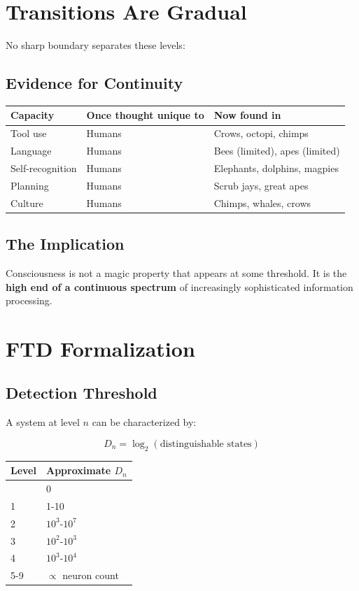 \documentclass[
  11pt,
  letterpaper,
  twoside,
  openright]{book}
\begin{document}
\section{Transitions Are Gradual}\label{transitions-are-gradual}

No sharp boundary separates these levels:

\subsection{Evidence for Continuity}\label{evidence-for-continuity}

\begin{longtable}[]{@{}lll@{}}
\toprule\noalign{}
Capacity & Once thought unique to & Now found in \\
\midrule\noalign{}
\endhead
\bottomrule\noalign{}
\endlastfoot
Tool use & Humans & Crows, octopi, chimps \\
Language & Humans & Bees (limited), apes (limited) \\
Self-recognition & Humans & Elephants, dolphins, magpies \\
Planning & Humans & Scrub jays, great apes \\
Culture & Humans & Chimps, whales, crows \\
\end{longtable}

\subsection{The Implication}\label{the-implication}

Consciousness is not a magic property that appears at some threshold. It
is the \textbf{high end of a continuous spectrum} of increasingly
sophisticated information processing.

\section{FTD Formalization}\label{ftd-formalization}

\subsection{Detection Threshold}\label{detection-threshold}

A system at level \(n\) can be characterized by:

\[D_n = \log_2(\text{distinguishable states})\]

\begin{longtable}[]{@{}ll@{}}
\toprule\noalign{}
Level & Approximate \(D_n\) \\
\midrule\noalign{}
\endhead
\bottomrule\noalign{}
\endlastfoot
0 & 0 \\
1 & 1-10 \\
2 & \(10^3\)-\(10^7\) \\
3 & \(10^2\)-\(10^3\) \\
4 & \(10^3\)-\(10^4\) \\
5-9 & \(\propto\) neuron count \\
\end{longtable}
\end{document}
